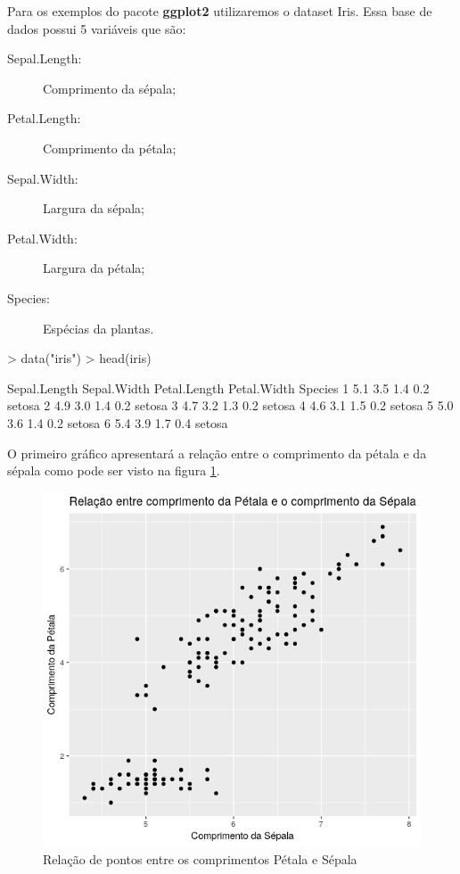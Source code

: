 \documentclass[12pt,a4paper,oneside]{erdc}
\begin{document}
Para os exemplos do pacote \textbf{ggplot2} utilizaremos o dataset Iris. Essa base de dados possui 5 variáveis que são:

\begin{description}
	\item [Sepal.Length:] Comprimento da sépala;
	\item [Petal.Length:] Comprimento da pétala;
	\item [Sepal.Width:] Largura da sépala;
	\item [Petal.Width:] Largura da pétala;
	\item [Species:] Espécias da plantas. 
\end{description}

\begin{Schunk}
\begin{Sinput}
> data("iris")
> head(iris)
\end{Sinput}
\begin{Soutput}
  Sepal.Length Sepal.Width Petal.Length Petal.Width Species
1          5.1         3.5          1.4         0.2  setosa
2          4.9         3.0          1.4         0.2  setosa
3          4.7         3.2          1.3         0.2  setosa
4          4.6         3.1          1.5         0.2  setosa
5          5.0         3.6          1.4         0.2  setosa
6          5.4         3.9          1.7         0.4  setosa
\end{Soutput}
\end{Schunk}

O primeiro gráfico apresentará a relação entre o comprimento da pétala e da sépala como pode ser visto na figura \ref{fig:f06-04}.


\begin{figure}[htpb]
	\centering
	\includegraphics[width=0.7\linewidth]{../figs/BP_Curso_TecComp_00_2019_f06-04}
	\caption{Relação de pontos entre os comprimentos Pétala e Sépala}
	\label{fig:f06-04}
\end{figure}
\end{document}
